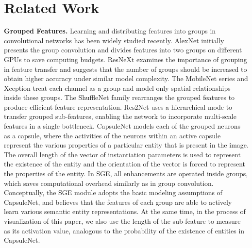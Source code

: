 \documentclass{article}
\begin{document}
	\section{Related Work}
	\textbf{Grouped Features.} Learning and distributing features into groups in convolutional networks has been widely studied recently. AlexNet \cite{krizhevsky2012imagenet} initially presents the {group convolution} and divides features into two groups on different GPUs to save computing budgets. ResNeXt \cite{xie2017aggregated} examines the importance of grouping in feature transfer and suggests that the number of groups should be increased to obtain higher accuracy under similar model complexity. The MobileNet series \cite{howard2017mobilenets,sandler2018mobilenetv2,howard2019searching} and Xception \cite{carreira1998xception} treat each channel as a group and model only spatial relationships inside these groups. The ShuffleNet \cite{zhang1707shufflenet,ma2018shufflenet} family rearranges the grouped features to produce efficient feature representation. Res2Net \cite{gao2019res2net} uses a hierarchical mode to transfer grouped sub-features, enabling the network to incorporate multi-scale features in a single bottleneck. CapsuleNet \cite{sabour2017dynamic} models each of the grouped neurons as a capsule, where the activities of the neurons within an active capsule represent the various properties of a particular entity that is present in the image. The overall length of the vector of instantiation parameters is used to represent the existence of the entity and the orientation of the vector is forced to represent the properties of the entity. In SGE, all enhancements are operated inside groups, which saves computational overhead similarly as in {group convolution}. Conceptually, the SGE module adopts the basic modeling assumptions of CapsuleNet, and believes that the features of each group are able to actively learn various semantic entity representations. At the same time, in the process of visualization of this paper, we also use the length of the sub-feature to measure as its activation value, analogous to the probability of the existence of entities in CapsuleNet.
	
\end{document}
